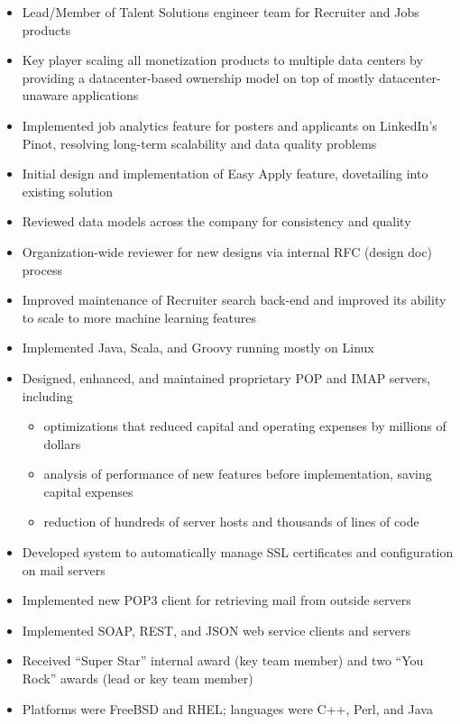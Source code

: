 \documentclass[letterpaper,11pt,twoside]{article}
\begin{document}
\vspace{-14pt}
\begin{itemize}
\item Lead/Member of Talent Solutions engineer team for Recruiter and Jobs products
\item Key player scaling all monetization products to multiple data centers by providing
  a datacenter-based ownership model on top of mostly datacenter-unaware applications
\item Implemented job analytics feature for posters and applicants on LinkedIn's Pinot,
  resolving long-term scalability and data quality problems
\item Initial design and implementation of Easy Apply feature, dovetailing into existing solution
\item Reviewed data models across the company for consistency and quality
\item Organization-wide reviewer for new designs via internal RFC (design doc) process
\item Improved maintenance of Recruiter search back-end and improved its
  ability to scale to more machine learning features
\item Implemented Java, Scala, and Groovy running mostly on Linux
\end{itemize}

\vspace{-14pt}
\begin{itemize}
\item Designed, enhanced, and maintained proprietary POP and IMAP
  servers, including
  \begin{itemize}
  \item optimizations that reduced capital and operating expenses
    by millions of dollars
  \item analysis of performance of new features before
    implementation, saving capital expenses
  \item reduction of hundreds of server hosts and thousands of lines of code
  \end{itemize}
\item Developed system to automatically manage SSL certificates and
  configuration on mail servers
\item Implemented new POP3 client for retrieving mail from outside servers
\item Implemented SOAP, REST, and JSON web service clients and servers
\item Received ``Super Star'' internal award (key team member) and 
  two ``You Rock'' awards (lead or key team member)
\item Platforms were FreeBSD and RHEL; languages were C++, Perl, and Java
\end{itemize}
\end{document}
